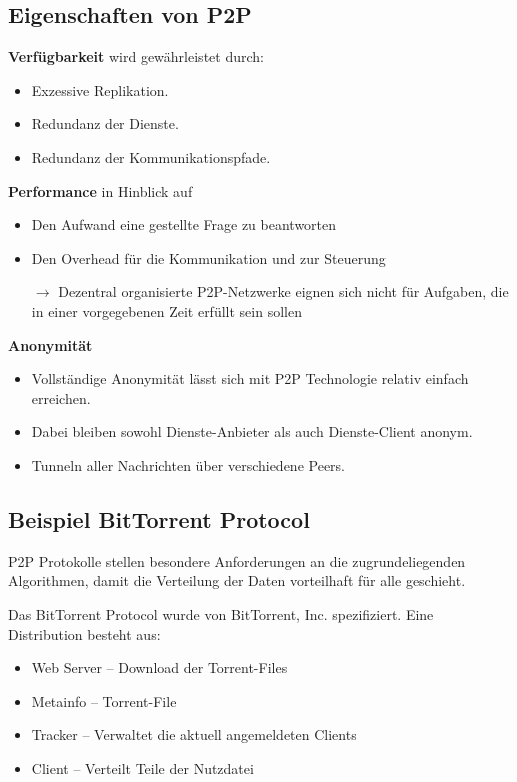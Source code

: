 \documentclass{article} %
\begin{document}
\subsection{Eigenschaften von P2P}
\textbf{Verfügbarkeit} wird gewährleistet durch:
	\begin{itemize}
	\item Exzessive Replikation.
	\item Redundanz der Dienste. 
	\item Redundanz der Kommunikationspfade.
	\end{itemize}
\textbf{Performance} in Hinblick auf 
	\begin{itemize}
	\item Den Aufwand eine gestellte Frage zu beantworten
	\item Den Overhead für die Kommunikation und zur Steuerung
	\item[$\rightarrow$] Dezentral organisierte P2P-Netzwerke eignen sich nicht für Aufgaben, die in einer vorgegebenen Zeit erfüllt sein sollen
	\end{itemize}
\textbf{Anonymität}
	\begin{itemize}
	\item Vollständige Anonymität lässt sich mit P2P Technologie relativ einfach erreichen. 
	\item Dabei bleiben sowohl Dienste-Anbieter als auch Dienste-Client anonym. 
	\item Tunneln aller Nachrichten über verschiedene Peers. 
	\end{itemize}
	
\subsection{Beispiel BitTorrent Protocol}
P2P Protokolle stellen besondere Anforderungen an die zugrundeliegenden Algorithmen, damit die Verteilung der Daten vorteilhaft für alle geschieht. 

Das BitTorrent Protocol wurde von BitTorrent, Inc. spezifiziert. Eine Distribution besteht aus:
	\begin{itemize}
	\item Web Server – Download der Torrent-Files 
	\item Metainfo – Torrent-File 
	\item Tracker – Verwaltet die aktuell angemeldeten Clients 
	\item Client – Verteilt Teile der Nutzdatei 
	\end{itemize}
	
\end{document}
